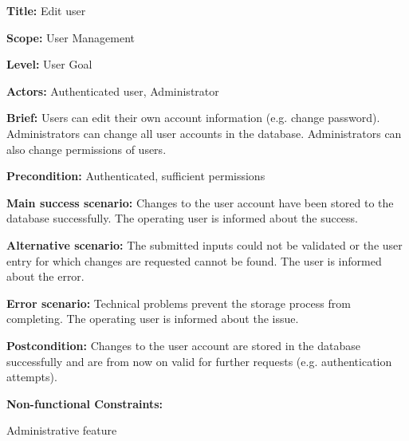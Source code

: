 
\begin{DoxyItemize}
\item {\bfseries{Title\+:}} Edit user
\item {\bfseries{Scope\+:}} User Management
\item {\bfseries{Level\+:}} User Goal
\item {\bfseries{Actors\+:}} Authenticated user, Administrator
\item {\bfseries{Brief\+:}} Users can edit their own account information (e.\+g. change password). Administrators can change all user accounts in the database. Administrators can also change permissions of users.
\end{DoxyItemize}


\begin{DoxyItemize}
\item {\bfseries{Precondition\+:}} Authenticated, sufficient permissions
\item {\bfseries{Main success scenario\+:}} Changes to the user account have been stored to the database successfully. The operating user is informed about the success.
\item {\bfseries{Alternative scenario\+:}} The submitted inputs could not be validated or the user entry for which changes are requested cannot be found. The user is informed about the error.
\item {\bfseries{Error scenario\+:}} Technical problems prevent the storage process from completing. The operating user is informed about the issue.
\item {\bfseries{Postcondition\+:}} Changes to the user account are stored in the database successfully and are from now on valid for further requests (e.\+g. authentication attempts).
\item {\bfseries{Non-\/functional Constraints\+:}}
\begin{DoxyItemize}
\item Administrative feature 
\end{DoxyItemize}
\end{DoxyItemize}